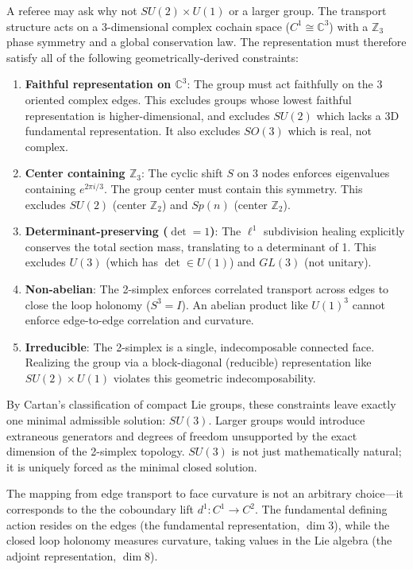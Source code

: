 \documentclass[
]{article}
\providecommand{\tightlist}{%
  \setlength{\itemsep}{0pt}\setlength{\parskip}{0pt}}
\begin{document}
A referee may ask why not \(SU(2) \times U(1)\) or a larger group. The
transport structure acts on a 3-dimensional complex cochain space
(\(C^1 \cong \mathbb{C}^3\)) with a \(\mathbb{Z}_3\) phase symmetry and
a global conservation law. The representation must therefore satisfy all
of the following geometrically-derived constraints:

\begin{enumerate}
\def\labelenumi{\arabic{enumi}.}
\tightlist
\item
  \textbf{Faithful representation on \(\mathbb{C}^3\)}: The group must
  act faithfully on the 3 oriented complex edges. This excludes groups
  whose lowest faithful representation is higher-dimensional, and
  excludes \(SU(2)\) which lacks a 3D fundamental representation. It
  also excludes \(SO(3)\) which is real, not complex.
\item
  \textbf{Center containing \(\mathbb{Z}_3\)}: The cyclic shift \(S\) on
  3 nodes enforces eigenvalues containing \(e^{2\pi i/3}\). The group
  center must contain this symmetry. This excludes \(SU(2)\) (center
  \(\mathbb{Z}_2\)) and \(Sp(n)\) (center \(\mathbb{Z}_2\)).
\item
  \textbf{Determinant-preserving (\(\det = 1\))}: The \(\ell^1\)
  subdivision healing explicitly conserves the total section mass,
  translating to a determinant of 1. This excludes \(U(3)\) (which has
  \(\det \in U(1)\)) and \(GL(3)\) (not unitary).
\item
  \textbf{Non-abelian}: The 2-simplex enforces correlated transport
  across edges to close the loop holonomy (\(S^3 = I\)). An abelian
  product like \(U(1)^3\) cannot enforce edge-to-edge correlation and
  curvature.
\item
  \textbf{Irreducible}: The 2-simplex is a single, indecomposable
  connected face. Realizing the group via a block-diagonal (reducible)
  representation like \(SU(2) \times U(1)\) violates this geometric
  indecomposability.
\end{enumerate}

By Cartan's classification of compact Lie groups, these constraints
leave exactly one minimal admissible solution: \(SU(3)\). Larger groups
would introduce extraneous generators and degrees of freedom unsupported
by the exact dimension of the 2-simplex topology. \(SU(3)\) is not just
mathematically natural; it is uniquely forced as the minimal closed
solution.

The mapping from edge transport to face curvature is not an arbitrary
choice---it corresponds to the the coboundary lift \(d^1: C^1 \to C^2\).
The fundamental defining action resides on the edges (the fundamental
representation, \(\dim 3\)), while the closed loop holonomy measures
curvature, taking values in the Lie algebra (the adjoint representation,
\(\dim 8\)).
\end{document}

